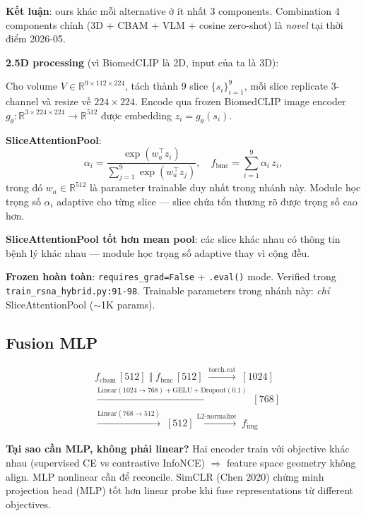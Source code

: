 \documentclass[11pt,a4paper]{article}
\begin{document}
\noindent\textbf{Kết luận}: ours khác mỗi alternative ở ít nhất 3
components. Combination 4 components chính (3D + CBAM + VLM + cosine
zero-shot) là \emph{novel} tại thời điểm 2026-05.

\noindent\textbf{2.5D processing} (vì BiomedCLIP là 2D, input của ta là 3D):

Cho volume $V \in \mathbb{R}^{9 \times 112 \times 224}$, tách thành 9
slice $\{s_i\}_{i=1}^{9}$, mỗi slice replicate 3-channel và resize về
$224 \times 224$. Encode qua frozen BiomedCLIP image encoder
$g_{\theta}: \mathbb{R}^{3 \times 224 \times 224} \to \mathbb{R}^{512}$
được embedding $z_i = g_{\theta}(s_i)$.

\textbf{SliceAttentionPool}:
\begin{equation}
\alpha_i = \frac{\exp(w_a^{\top} z_i)}
                {\sum_{j=1}^{9} \exp(w_a^{\top} z_j)},
\quad
f_{\text{bmc}} = \sum_{i=1}^{9} \alpha_i \, z_i,
\label{eq:slicepool_vi}
\end{equation}
trong đó $w_a \in \mathbb{R}^{512}$ là parameter trainable duy nhất
trong nhánh này. Module học trọng số $\alpha_i$ adaptive cho từng
slice --- slice chứa tổn thương rõ được trọng số cao hơn.

\noindent\textbf{SliceAttentionPool tốt hơn mean pool}: các slice khác
nhau có thông tin bệnh lý khác nhau --- module học trọng số adaptive
thay vì cộng đều.

\noindent\textbf{Frozen hoàn toàn}: \verb|requires_grad=False| +
\verb|.eval()| mode. Verified trong \verb|train_rsna_hybrid.py:91-98|.
Trainable parameters trong nhánh này: \emph{chỉ} SliceAttentionPool
($\sim$1K params).

\subsection{Fusion MLP}

\begin{equation*}
\begin{aligned}
&f_{\text{cbam}}\,[512] \;\Vert\; f_{\text{bmc}}\,[512]
   \;\xrightarrow{\text{torch.cat}}\; [1024] \\
&\xrightarrow{\text{Linear}(1024 \to 768) + \text{GELU} + \text{Dropout}(0.1)}\; [768] \\
&\xrightarrow{\text{Linear}(768 \to 512)}\; [512]
   \xrightarrow{\text{L2-normalize}}\; f_{\text{img}}
\end{aligned}
\end{equation*}

\noindent\textbf{Tại sao cần MLP, không phải linear?} Hai encoder train
với objective khác nhau (supervised CE vs contrastive InfoNCE)
$\Rightarrow$ feature space geometry không align. MLP nonlinear cần
để reconcile. SimCLR (Chen 2020) chứng minh projection head (MLP) tốt
hơn linear probe khi fuse representations từ different objectives.
\end{document}
